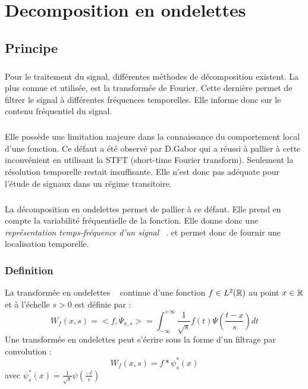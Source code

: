 
\chapter{Decomposition en ondelettes}



\section{Principe}
\paragraph{}
Pour le traitement du signal, différentes méthodes de décomposition existent.
La plus connue et utilisée, est la transformée de Fourier. Cette dernière permet de filtrer le signal à différentes fréquences temporelles. Elle informe donc sur le contenu fréquentiel du signal.
\paragraph{}
Elle possède une limitation majeure dans la connaissance du comportement local d'une fonction.
Ce défaut a été observé par D.Gabor qui a réussi à pallier à cette inconvénient en utilisant la STFT (short-time Fourier transform). Seulement la résolution temporelle restait insuffisante.
Elle n'est donc pas adéquate pour l'étude de signaux dans un régime transitoire. ~\cite{GaoR}
\paragraph{}
La décomposition en ondelettes permet de pallier à ce défaut.
Elle prend en compte la variabilité fréquentielle de la fonction. 
Elle donne donc une \emph{représentation temps-fréquence d'un signal} ~\cite{JBigot}.
et permet donc de fournir une localisation temporelle.

\subsection{Definition}
La transformée en ondelettes ~\cite{JBigot} continue d'une fonction $f  \in L^{2}(\mathbb{R})$ au point $x \in \mathbb{R} $
et à l'échelle $ s>0 $ est définie par  :
\begin{equation}
W_{f}(x,s) = <f,\Psi_{x,s}> = \int^{+\infty}_{- \infty} \frac{1}{\sqrt{s}}f(t)\Psi(\frac{t-x}{s})dt
\end{equation} 
Une transformée en ondelettes peut s'écrire sous la forme d'un filtrage par convolution :
\begin{equation}
W_{f}(x,s) = f * \psi^{*}_{s}(x)
\end{equation}
avec  $\psi^{*}_{s}(x) = \frac{1}{\sqrt{s}} \psi(\frac{-t}{s})$

